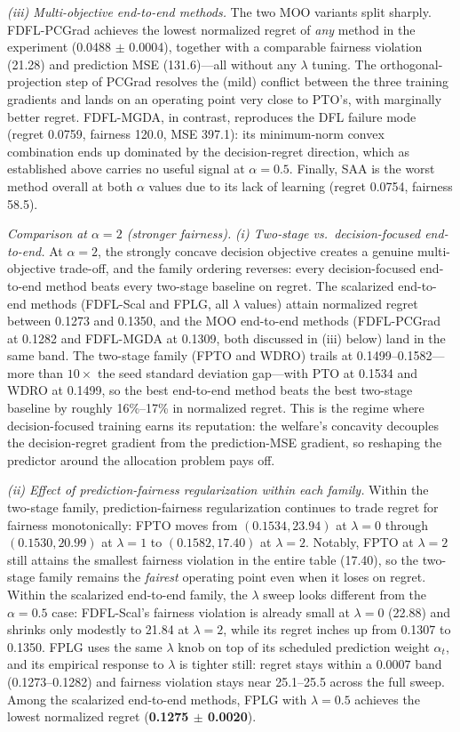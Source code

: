 \documentclass[ijoc,sglanonrev]{informs4}
\begin{document}
\emph{(iii) Multi-objective end-to-end methods.}
The two MOO variants split sharply. FDFL-PCGrad achieves the lowest normalized regret of \emph{any} method in the experiment (0.0488 $\pm$ 0.0004), together with a comparable fairness violation (21.28) and prediction MSE (131.6)---all without any $\lambda$ tuning. The orthogonal-projection step of PCGrad resolves the (mild) conflict between the three training gradients and lands on an operating point very close to PTO's, with marginally better regret. FDFL-MGDA, in contrast, reproduces the DFL failure mode (regret 0.0759, fairness 120.0, MSE 397.1): its minimum-norm convex combination ends up dominated by the decision-regret direction, which as established above carries no useful signal at $\alpha = 0.5$. Finally, SAA is the worst method overall at both $\alpha$ values due to its lack of learning (regret 0.0754, fairness 58.5).

\textit{Comparison at $\alpha = 2$ (stronger fairness).}
\emph{(i) Two-stage vs.\ decision-focused end-to-end.}
At $\alpha = 2$, the strongly concave decision objective creates a genuine multi-objective trade-off, and the family ordering reverses: every decision-focused end-to-end method beats every two-stage baseline on regret. The scalarized end-to-end methods (FDFL-Scal and FPLG, all $\lambda$ values) attain normalized regret between 0.1273 and 0.1350, and the MOO end-to-end methods (FDFL-PCGrad at 0.1282 and FDFL-MGDA at 0.1309, both discussed in (iii) below) land in the same band. The two-stage family (FPTO and WDRO) trails at 0.1499--0.1582---more than $10\times$ the seed standard deviation gap---with PTO at 0.1534 and WDRO at 0.1499, so the best end-to-end method beats the best two-stage baseline by roughly 16\%--17\% in normalized regret. This is the regime where decision-focused training earns its reputation: the welfare's concavity decouples the decision-regret gradient from the prediction-MSE gradient, so reshaping the predictor around the allocation problem pays off.

\emph{(ii) Effect of prediction-fairness regularization within each family.}
Within the two-stage family, prediction-fairness regularization continues to trade regret for fairness monotonically: FPTO moves from $(0.1534, 23.94)$ at $\lambda = 0$ through $(0.1530, 20.99)$ at $\lambda = 1$ to $(0.1582, 17.40)$ at $\lambda = 2$. Notably, FPTO at $\lambda = 2$ still attains the smallest fairness violation in the entire table (17.40), so the two-stage family remains the \emph{fairest} operating point even when it loses on regret. Within the scalarized end-to-end family, the $\lambda$ sweep looks different from the $\alpha = 0.5$ case: FDFL-Scal's fairness violation is already small at $\lambda = 0$ (22.88) and shrinks only modestly to 21.84 at $\lambda = 2$, while its regret inches up from 0.1307 to 0.1350. FPLG uses the same $\lambda$ knob on top of its scheduled prediction weight $\alpha_t$, and its empirical response to $\lambda$ is tighter still: regret stays within a $0.0007$ band (0.1273--0.1282) and fairness violation stays near 25.1--25.5 across the full sweep. Among the scalarized end-to-end methods, FPLG with $\lambda = 0.5$ achieves the lowest normalized regret (\textbf{0.1275 $\pm$ 0.0020}).
\end{document}
